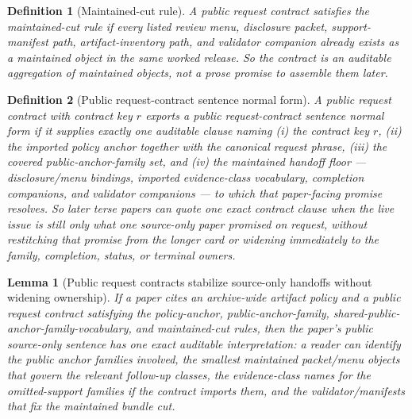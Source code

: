 \documentclass[11pt]{article}
\newtheorem{definition}{Definition}
\newtheorem{lemma}{Lemma}
\begin{document}
\begin{definition}[Maintained-cut rule]
A public request contract satisfies the \emph{maintained-cut rule} if every listed review menu, disclosure packet, support-manifest path, artifact-inventory path, and validator companion already exists as a maintained object in the same worked release.
So the contract is an auditable aggregation of maintained objects, not a prose promise to assemble them later.
\end{definition}

\begin{definition}[Public request-contract sentence normal form]
A public request contract with contract key $r$ exports a \emph{public request-contract sentence normal form} if it supplies exactly one auditable clause naming (i) the contract key $r$, (ii) the imported policy anchor together with the canonical request phrase, (iii) the covered public-anchor-family set, and (iv) the maintained handoff floor --- disclosure/menu bindings, imported evidence-class vocabulary, completion companions, and validator companions --- to which that paper-facing promise resolves.
So later terse papers can quote one exact contract clause when the live issue is still only what one source-only paper promised on request, without restitching that promise from the longer card or widening immediately to the family, completion, status, or terminal owners.
\end{definition}

\begin{lemma}[Public request contracts stabilize source-only handoffs without widening ownership]
If a paper cites an archive-wide artifact policy and a public request contract satisfying the policy-anchor, public-anchor-family, shared-public-anchor-family-vocabulary, and maintained-cut rules, then the paper's public source-only sentence has one exact auditable interpretation: a reader can identify the public anchor families involved, the smallest maintained packet/menu objects that govern the relevant follow-up classes, the evidence-class names for the omitted-support families if the contract imports them, and the validator/manifests that fix the maintained bundle cut.
\end{lemma}
\end{document}

